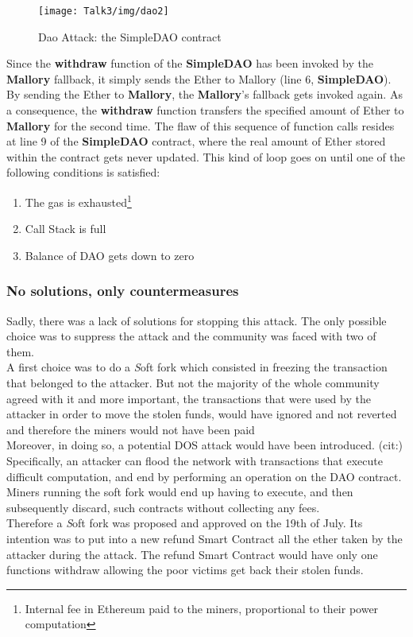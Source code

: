\begin{figure}[H]
\begin{center}
\texttt{[image: Talk3/img/dao2]}
\end{center}
\caption{Dao Attack: the SimpleDAO contract}
\label{label}
\end{figure}
Since the \textbf{withdraw} function of the \textbf{SimpleDAO} has been invoked by the \textbf{Mallory} fallback, it simply sends the Ether to Mallory (line 6, \textbf{SimpleDAO}). By sending the Ether to \textbf{Mallory}, the \textbf{Mallory}'s fallback gets invoked again. As a consequence, the \textbf{withdraw} function transfers the specified amount of Ether to \textbf{Mallory} for the second time. The flaw of this sequence of function calls resides at line 9 of the \textbf{SimpleDAO} contract, where the real amount of Ether stored within the contract gets never updated. 
This kind of loop goes on until one of the following conditions is satisfied: \\
\begin{enumerate}
\item The gas is exhausted\footnote{Internal fee in Ethereum paid to the miners, proportional to their power computation}
\item Call Stack is full
\item Balance of DAO gets down to zero  
\end{enumerate}





\subsubsection{No solutions, only countermeasures}
Sadly, there was a lack of solutions for stopping this attack. The only possible choice was to suppress the attack and the community was faced with two of them.
\\A first choice was to do a {\textit Soft fork} which consisted in freezing the transaction that belonged to the attacker. But not the majority of the whole community agreed with it and more important, the transactions that were used by the attacker in order to move the stolen funds, would have ignored and not reverted and therefore the miners would not have been paid
\\Moreover, in doing so, a potential DOS attack would have been introduced. 
(cit:)
Specifically, an attacker can flood the network with transactions that execute difficult computation, and end by performing an operation on the DAO contract. Miners running the soft fork would end up having to execute, and then subsequently discard, such contracts without collecting any fees.
\\Therefore a {\textit Soft fork} was proposed and approved on the 19th of July. Its intention was to put into a new refund Smart Contract all the ether taken by the attacker during the attack. The refund Smart Contract would have only one functions withdraw allowing the poor victims get back their stolen funds.
